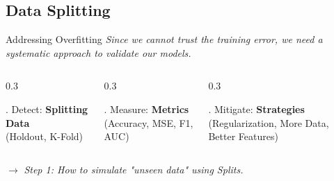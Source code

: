 \subsection{Data Splitting}

\begin{frame}{Addressing Overfitting}
    \centering
    \large \textit{Since we cannot trust the training error, we need a systematic approach to validate our models.}
    
    \vspace{0.8cm}
    
    \begin{columns}[T]
        \begin{column}{0.3\textwidth}
            \begin{block}{. Detect:}
                \centering
                \textbf{Splitting Data}\\
                (Holdout, K-Fold)
            \end{block}
        \end{column}
        \begin{column}{0.3\textwidth}
            \begin{block}{. Measure:}
                \centering
                \textbf{Metrics}\\
                (Accuracy, MSE, F1, AUC)
            \end{block}
        \end{column}
        \begin{column}{0.3\textwidth}
            \begin{block}{. Mitigate:}
                \centering
                \textbf{Strategies}\\
                (Regularization, More Data, Better Features)
            \end{block}
        \end{column}
    \end{columns}
    
    \vspace{0.5cm}
    \centering
    \small $\rightarrow$ \textit{Step 1: How to simulate "unseen data" using Splits.}
\end{frame}



